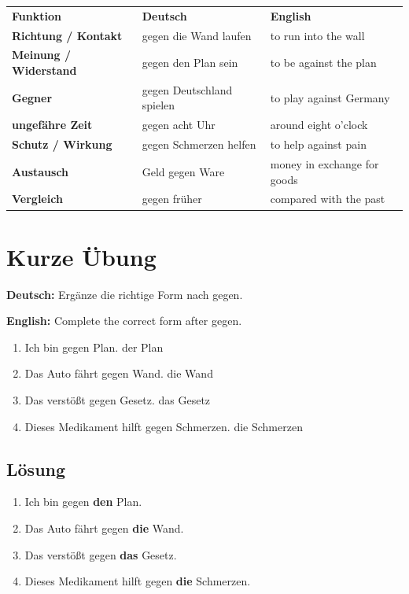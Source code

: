 \documentclass[a4paper,11pt]{article}
\newcommand{\GermanText}[1]{\textbf{Deutsch: }#1\par}
\newcommand{\EnglishText}[1]{{\small\color{SoftGray}\textbf{English: }#1\par}}
\newcommand{\Correct}[1]{\textcolor{HeaderBlueDark}{\textbf{#1}}}
\begin{document}
\begin{tabularx}{\textwidth}{>{\bfseries}p{}X X}
\rowcolor{HeaderBlueDark}
\color{white}\textbf{Funktion} & \color{white}\textbf{Deutsch} & \color{white}\textbf{English} \\
Richtung / Kontakt & gegen die Wand laufen & to run into the wall \\
Meinung / Widerstand & gegen den Plan sein & to be against the plan \\
Gegner & gegen Deutschland spielen & to play against Germany \\
ungefähre Zeit & gegen acht Uhr & around eight o'clock \\
Schutz / Wirkung & gegen Schmerzen helfen & to help against pain \\
Austausch & Geld gegen Ware & money in exchange for goods \\
Vergleich & gegen früher & compared with the past \\
\end{tabularx}

\section{Kurze Übung}

\GermanText{Ergänze die richtige Form nach \glqq gegen\grqq.}
\EnglishText{Complete the correct form after \glqq gegen\grqq.}

\begin{enumerate}
    \item Ich bin gegen \underline{\hspace{2.5cm}} Plan. \hfill der Plan
    \item Das Auto fährt gegen \underline{\hspace{2.5cm}} Wand. \hfill die Wand
    \item Das verstößt gegen \underline{\hspace{2.5cm}} Gesetz. \hfill das Gesetz
    \item Dieses Medikament hilft gegen \underline{\hspace{2.5cm}} Schmerzen. \hfill die Schmerzen
\end{enumerate}

\subsection{Lösung}

\begin{enumerate}
    \item Ich bin gegen \Correct{den} Plan.
    \item Das Auto fährt gegen \Correct{die} Wand.
    \item Das verstößt gegen \Correct{das} Gesetz.
    \item Dieses Medikament hilft gegen \Correct{die} Schmerzen.
\end{enumerate}
\end{document}
